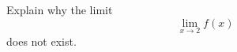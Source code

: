\documentclass[handout]{ximera}
\begin{document}
\begin{example}
\begin{image}
\end{image}
Explain why the limit
\[
\lim_{x\to 2} f(x)
\]
does not exist.
%
%
%
%          
%

\end{example}
\end{document}
